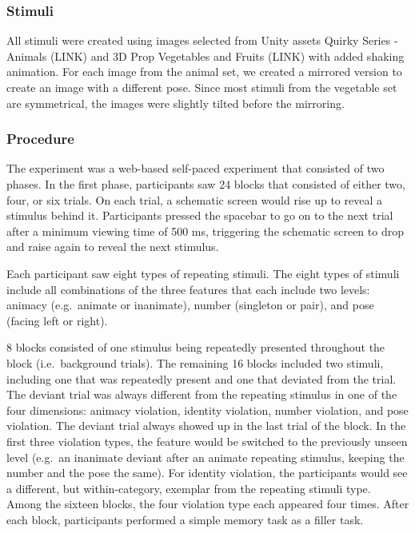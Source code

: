 \documentclass[10pt, letterpaper]{article}
\begin{document}
\hypertarget{stimuli}{%
\subsubsection{Stimuli}\label{stimuli}}

All stimuli were created using images selected from Unity assets Quirky
Series - Animals (LINK) and 3D Prop Vegetables and Fruits (LINK) with
added shaking animation. For each image from the animal set, we created
a mirrored version to create an image with a different pose. Since most
stimuli from the vegetable set are symmetrical, the images were slightly
tilted before the mirroring.

\hypertarget{procedure}{%
\subsubsection{Procedure}\label{procedure}}

The experiment was a web-based self-paced experiment that consisted of
two phases. In the first phase, participants saw 24 blocks that
consisted of either two, four, or six trials. On each trial, a schematic
screen would rise up to reveal a stimulus behind it. Participants
pressed the spacebar to go on to the next trial after a minimum viewing
time of 500 ms, triggering the schematic screen to drop and raise again
to reveal the next stimulus.

Each participant saw eight types of repeating stimuli. The eight types
of stimuli include all combinations of the three features that each
include two levels: animacy (e.g.~animate or inanimate), number
(singleton or pair), and pose (facing left or right).

8 blocks consisted of one stimulus being repeatedly presented throughout
the block (i.e.~background trials). The remaining 16 blocks included two
stimuli, including one that was repeatedly present and one that deviated
from the trial. The deviant trial was always different from the
repeating stimulus in one of the four dimensions: animacy violation,
identity violation, number violation, and pose violation. The deviant
trial always showed up in the last trial of the block. In the first
three violation types, the feature would be switched to the previously
unseen level (e.g.~an inanimate deviant after an animate repeating
stimulus, keeping the number and the pose the same). For identity
violation, the participants would see a different, but within-category,
exemplar from the repeating stimuli type. Among the sixteen blocks, the
four violation type each appeared four times. After each block,
participants performed a simple memory task as a filler task.
\end{document}
